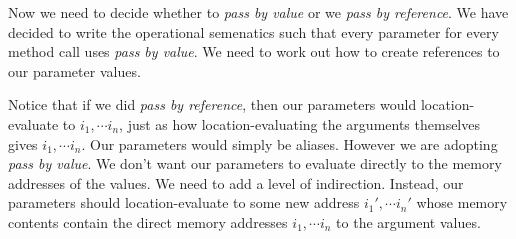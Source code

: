 




Now we need to decide whether to \textit{pass by value} or we \textit{pass by reference}.
We have decided to write the operational semenatics such that every parameter for 
every method call uses \textit{pass by value}. We need to work out how to 
create references to our parameter values. 

Notice that if we did \textit{pass by reference}, then our parameters would location-evaluate to 
$i_1, \cdots i_n$, just as how location-evaluating the arguments themselves gives 
$i_1, \cdots i_n$. Our parameters would simply be aliases.
However we are adopting \textit{pass by value}. We don't want our 
parameters to evaluate directly to the memory addresses of the values. 
We need to add a level of indirection.
Instead, our parameters should location-evaluate to some new address $i_1', \cdots i_n'$ whose 
memory contents contain the direct memory addresses $i_1, \cdots i_n$ to the argument values. 

